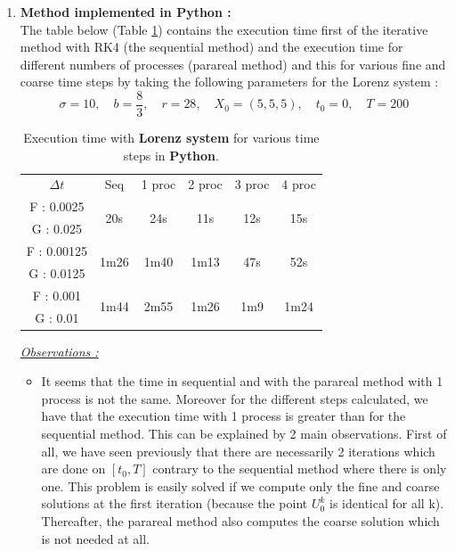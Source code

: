 \begin{enumerate}[label=\textbullet]
	\item \textbf{Method implemented in Python :} \\
	The table below (Table \ref{time}) contains the execution time first of the iterative method with RK4 (the sequential method) and the execution time for different numbers of processes (parareal method) and this for various fine and coarse time steps by taking the following parameters for the Lorenz system :
	$$\sigma=10, \quad b=\frac{8}{3}, \quad r=28, \quad X_0=(5,5,5), \quad t_0=0, \quad T=200$$
	\renewcommand{\arraystretch}{1.2}
	\begin{table}[H]
		\centering
		\begin{tabular}{| c || c | c | c | c | c |}
			\hline
			\multirow{2}{1.5 cm}{$\Delta t$} & \multirow{2}{1.5 cm}{Seq} & \multirow{2}{1.5 cm}{1 proc} & \multirow{2}{1.5 cm}{2 proc} & \multirow{2}{1.5 cm}{3 proc} &\multirow{2}{1.5 cm}{4 proc} \\
			& & & & & \\
			\hline 
			F : 0.0025 & \multirow{2}{1.5 cm}{20s} & \multirow{2}{1.5 cm}{24s} & \multirow{2}{1.5 cm}{11s} & \multirow{2}{1.5 cm}{12s} & \multirow{2}{1.5 cm}{15s} \\
			G : 0.025 & & & & & \\
			\hline 
			F : 0.00125 & \multirow{2}{1.5 cm}{1m26} & \multirow{2}{1.5 cm}{1m40} & \multirow{2}{1.5 cm}{1m13} & \multirow{2}{1.5 cm}{47s} & \multirow{2}{1.5 cm}{52s} \\
			G : 0.0125 & & & & & \\
			\hline 
			F : 0.001 & \multirow{2}{1.5 cm}{1m44} & \multirow{2}{1.5 cm}{2m55} & \multirow{2}{1.5 cm}{1m26} & \multirow{2}{1.5 cm}{1m9} & \multirow{2}{1.5 cm}{1m24} \\
			G : 0.01 & & & & & \\	 
			\hline
		\end{tabular}
		\caption{Execution time with \textbf{Lorenz system} for various time steps in \textbf{Python}.}
		\label{time}
	\end{table}
	\newpage
	\noindent \underline{\textit{Observations :}} 
	\begin{itemize}[label=-]
		\item It seems that the time in sequential and with the parareal method with 1 process is not the same. Moreover for the different steps calculated, we have that the execution time with 1 process is greater than for the sequential method. This can be explained by 2 main observations. First of all, we have seen previously that there are necessarily 2 iterations which are done on $[t_0,T]$ contrary to the sequential method where there is only one. This problem is easily solved if we compute only the fine and coarse solutions at the first iteration (because the point $U_0^k$ is identical for all k). Thereafter, the parareal method also computes the coarse solution which is not needed at all.

\end{itemize}
\end{enumerate}
